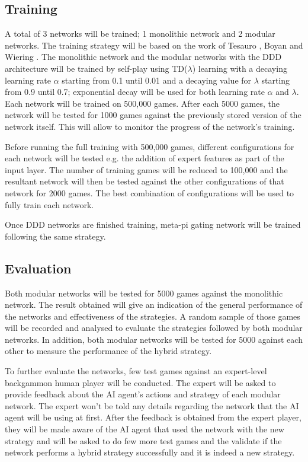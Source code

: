 \documentclass[12pt,a4paper]{article}
\begin{document}
\subsection{Training}
A total of 3 networks will be trained; 1 monolithic network and 2 modular networks. The training strategy will be based on the work of Tesauro \citeyear{DBLP:journals/neco/Tesauro94}, Boyan \citeyear{boyan} and Wiering \citeyear{DBLP:journals/jilsa/Wiering10}. The monolithic network and the modular networks with the DDD architecture will be trained by self-play using TD($\lambda$) learning with a decaying learning rate $\alpha$ starting from 0.1 until 0.01 and a decaying value for $\lambda$ starting from 0.9 until 0.7; exponential decay will be used for both learning rate $\alpha$ and $\lambda$. Each network will be trained on 500,000 games. After each 5000 games, the network will be tested for 1000 games against the previously stored version of the network itself. This will allow to monitor the progress of the network's training. 

Before running the full training with 500,000 games, different configurations for each network will be tested e.g. the addition of expert features as part of the input layer. The number of training games will be reduced to 100,000 and the resultant network will then be tested against the other configurations of that network for 2000 games. The best combination of configurations will be used to fully train each network.

Once DDD networks are finished training, meta-pi gating network will be trained following the same strategy.

\subsection{Evaluation}
Both modular networks will be tested for 5000 games against the monolithic network. The result obtained will give an indication of the general performance of the networks and effectiveness of the strategies. A random sample of those games will be recorded and analysed to evaluate the strategies followed by both modular networks. In addition, both modular networks will be tested for 5000 against each other to measure the performance of the hybrid strategy.

To further evaluate the networks, few test games against an expert-level backgammon human player will be conducted. The expert will be asked to provide feedback about the AI agent's actions and strategy of each modular network. The expert won't be told any details regarding the network that the AI agent will be using at first. After the feedback is obtained from the expert player, they will be made aware of the AI agent that used the network with the new strategy and will be asked to do few more test games and the validate if the network performs a hybrid strategy successfully and it is indeed a new strategy.
\end{document}

